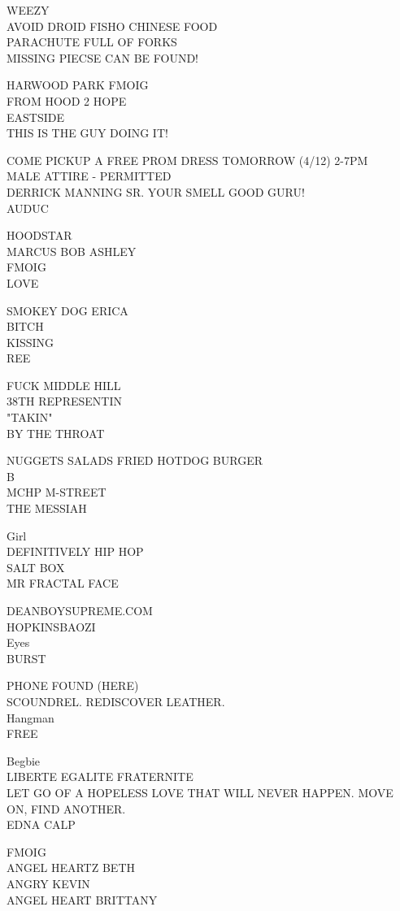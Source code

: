 \documentclass[10pt,letterpaper]{article}
\begin{document}
WEEZY\\
AVOID DROID FISHO CHINESE FOOD\\
PARACHUTE FULL OF FORKS\\
MISSING PIECSE CAN BE FOUND!

HARWOOD PARK FMOIG\\
FROM HOOD 2 HOPE\\
EASTSIDE\\
THIS IS THE GUY DOING IT!

COME PICKUP A FREE PROM DRESS TOMORROW (4/12) 2{-}7PM\\
MALE ATTIRE {-} PERMITTED\\
DERRICK MANNING SR.  YOUR SMELL GOOD GURU!\\
AUDUC

HOODSTAR\\
MARCUS BOB ASHLEY\\
FMOIG\\
LOVE

SMOKEY DOG ERICA\\
BITCH\\
KISSING\\
REE

FUCK MIDDLE HILL\\
38TH REPRESENTIN\\
"TAKIN"\\
BY THE THROAT

NUGGETS SALADS FRIED HOTDOG BURGER\\
B\\
MCHP M{-}STREET\\
THE MESSIAH

Girl\\
DEFINITIVELY HIP HOP\\
SALT BOX\\
MR FRACTAL FACE

DEANBOYSUPREME.COM\\
HOPKINSBAOZI\\
Eyes\\
BURST

PHONE FOUND (HERE)\\
SCOUNDREL.  REDISCOVER LEATHER.\\
Hangman\\
FREE

Begbie\\
LIBERTE EGALITE FRATERNITE\\
LET GO OF A HOPELESS LOVE THAT WILL NEVER HAPPEN.  MOVE ON, FIND ANOTHER.\\
EDNA CALP

FMOIG\\
ANGEL HEARTZ BETH\\
ANGRY KEVIN\\
ANGEL HEART BRITTANY
\end{document}
